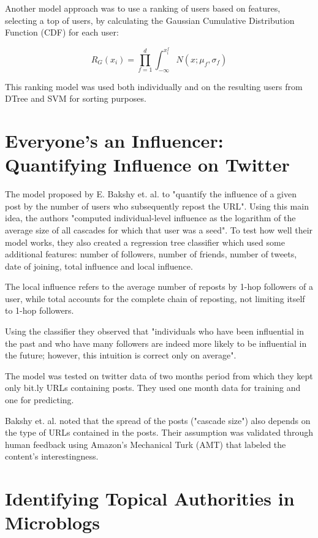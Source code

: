 Another model approach was to use a ranking of users based on features, selecting a top of users, by calculating the Gaussian Cumulative Distribution Function (CDF) for each user:

$$R_G(x_i) = \prod_{f=1}^{d}\int_{-\infty}^{x_i^f} N(x; \mu_f, \sigma_f)$$

This ranking model was used both individually and on the resulting users from DTree and SVM for sorting purposes.

\section{Everyone’s an Influencer: Quantifying Influence on Twitter}

The model proposed by E. Bakshy et. al.\cite{bakshy} to "quantify the influence of a given post by the number of users who subsequently repost the URL". Using this main idea, the authors "computed individual-level influence as the logarithm of the average size of all cascades for which that user was a seed". To test how well their model works, they also created a regression tree classifier which used some additional features: number of followers, number of friends, number of tweets, date of joining, total influence and local influence.

The local influence refers to the average number of reposts by 1-hop followers of a user, while total accounts for the complete chain of reposting, not limiting itself to 1-hop followers.

Using the classifier they observed that "individuals who have been influential in the past and who have many followers are indeed more likely to be influential in the future; however, this intuition is correct only on average".

The model was tested on twitter data of two months period from which they kept only bit.ly URLs containing posts. They used one month data for training and one for predicting.

Bakshy et. al.\cite{bakshy} noted that the spread of the posts ("cascade size") also depends on the type of URLs contained in the posts. Their assumption was validated through human feedback using Amazon’s Mechanical Turk (AMT) that labeled the content's interestingness.


\section{Identifying Topical Authorities in Microblogs}

